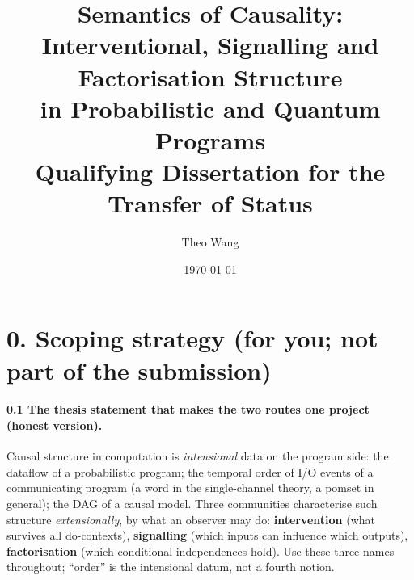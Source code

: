\documentclass[11pt,a4paper]{article}
\title{Semantics of Causality:\\ Interventional, Signalling and Factorisation Structure\\ in Probabilistic and Quantum Programs\\[1ex]
\large Qualifying Dissertation for the Transfer of Status}
\author{Theo Wang}
\date{\today}
\newif\ifskeletonnotes
\newcommand{\sknote}[1]{\ifskeletonnotes{\small\color{blue!60!black}\textit{[#1]}}\fi}
\begin{document}
\maketitle

\ifskeletonnotes
\section*{0. Scoping strategy (for you; not part of the submission)}
\sknote{Handbook (2026, \S5.2.2 req.\ IV, \S5.2.3): literature review ``around 5000 words (or more)'', a first draft of the thesis' literature-review chapter, showing critical understanding; thesis proposal around 6 pages at $\geq$11pt, answering the six set questions (i)--(vi), with a plan of work and milestones showing submission within 12 terms. The viva concentrates on the proposal, which must be readable on its own. You have chosen a shorter review ($\approx$3500 words); the assessors see the 5000 figure, so make the review dense rather than thin: every section must end in a critical comparison.}

\sknote{Dates (confirm with the GSA): if MT26 is your 4th term the documents are due Wednesday of week 5 = 11 November 2026 (Full Term began Sunday 11 Oct 2026). The Research Integrity Certificate and PRS Course Results form were due Friday of 0th week; check they are in. Confirmation of Status by your 9th term = TT28.}

\sknote{Strip before submission: set \texttt{\textbackslash skeletonnotesfalse}; remove ``Route A/B'' wording if any; keep the one tiering sentence in \S1.}

\paragraph{0.1 The thesis statement that makes the two routes one project (honest version).}
Causal structure in computation is \emph{intensional} data on the program side: the dataflow of a probabilistic program; the temporal order of I/O events of a communicating program (a word in the single-channel theory, a pomset in general); the DAG of a causal model. Three communities characterise such structure \emph{extensionally}, by what an observer may do: \textbf{intervention} (what survives all $\mathrm{do}$-contexts), \textbf{signalling} (which inputs can influence which outputs), \textbf{factorisation} (which conditional independences hold). Use these three names throughout; ``order'' is the intensional datum, not a fourth notion.
\end{document}
